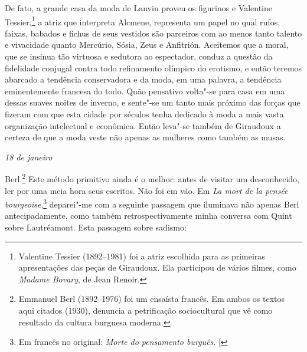 De fato, a grande casa da moda de Lanvin proveu os figurinos e Valentine
Tessier,\footnote{Valentine Tessier (1892--1981) foi a atriz
  escolhida para as primeiras apresentações das peças de Giraudoux. Ela
  participou de vários filmes, como \emph{Madame Bovary}, de Jean
  Renoir. \versal{[N.~O.]}} a atriz que interpreta Alcmene, representa um papel no qual
rufos, faixas, babados e fichus de seus vestidos são parceiros com ao
menos tanto talento e vivacidade quanto Mercúrio, Sósia, Zeus e
Anfitrión. Aceitemos que a moral, que se insinua tão virtuosa e sedutora
ao espectador, conduz a questão da fidelidade conjugal contra todo
refinamento olímpico do erotismo, e então teremos abarcado a tendência conservadora e da moda, em uma palavra, a tendência eminentemente francesa do todo. Quão pensativo volta"-se
para casa em uma dessas suaves noites de inverno, e sente"-se um
tanto mais próximo das forças que fizeram com que esta cidade por
séculos tenha dedicado à moda a mais vasta organização intelectual e
econômica. Então leva"-se também de Giraudoux a certeza de que a moda
veste não apenas as mulheres como também as musas.

\begin{flushright}
\emph{18 de janeiro}
\end{flushright}

Berl.\footnote{Emmanuel Berl (1892--1976) foi um
  ensaísta francês. Em ambos os textos aqui citados (1930), denuncia a
  petrificação sociocultural que vê como resultado da cultura
  burguesa moderna. \versal{[N.~O.]}} Este método primitivo ainda é o melhor: antes de
visitar um desconhecido, ler por uma meia hora seus escritos. Não foi em
vão. Em \emph{La mort de la pensée bourgeoise},\footnote{Em francês no original: \emph{Morte do pensamento burguês}. {[}\versal{N.~T}{]}} deparei"-me com a seguinte
passagem que iluminava não apenas Berl antecipadamente, como também
retrospectivamente minha conversa com Quint sobre Lautréamont. Esta
passagem sobre sadismo:

